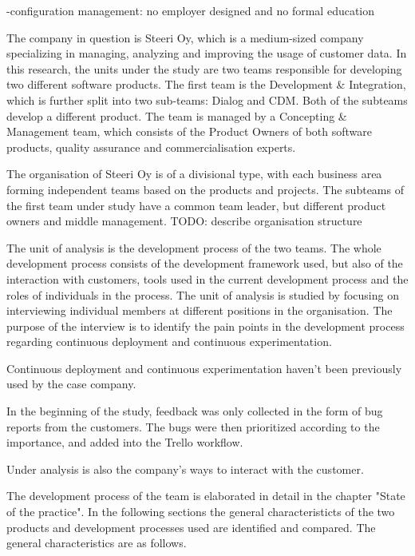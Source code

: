 \documentclass[english]{tktltiki2}
\theoremstyle{definition}
\theoremstyle{remark}
\begin{document}
-configuration management: no employer designed and no formal education

The company in question is Steeri Oy, which is a medium-sized company specializing in managing, analyzing and improving the usage of customer data. In this research, the units under the study are two teams responsible for developing two different software products. The first team is the Development \& Integration, which is further split into two sub-teams: Dialog and CDM. Both of the subteams develop a different product. The team is managed by a Concepting \& Management team, which consists of the Product Owners of both software products, quality assurance and commercialisation experts. 

The organisation of Steeri Oy is of a divisional type, with each business area forming independent teams based on the products and projects. The subteams of the first team under study have a common team leader, but different product owners and middle management. TODO: describe organisation structure %

The unit of analysis is the development process of the two teams. The whole development process consists of the development framework used, but also of the interaction with customers, tools used in the current development process and the roles of individuals in the process. The unit of analysis is studied by focusing on interviewing individual members at different positions in the organisation. The purpose of the interview is to identify the pain points in the development process regarding continuous deployment and continuous experimentation. 

Continuous deployment and continuous experimentation haven't been previously used by the case company. 

In the beginning of the study, feedback was only collected in the form of bug reports from the customers. The bugs were then prioritized according to the importance, and added into the Trello workflow. 

Under analysis is also the company's ways to interact with the customer.

The development process of the team is elaborated in detail in the chapter "State of the practice". In the following sections the general characteristicts of the two products and development processes used are identified and compared. The general characteristics are as follows. 
\end{document}
